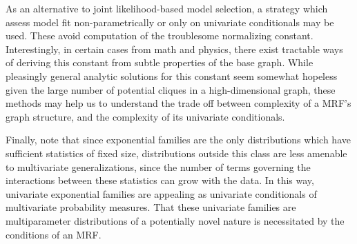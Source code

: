\documentclass{samkoelleprelimworking}
\begin{document}
As an alternative to joint likelihood-based model selection, a strategy which assess model fit non-parametrically or only on univariate conditionals may be used.  These avoid computation of the troublesome normalizing constant.  Interestingly, in certain cases from math and physics, there exist tractable ways of deriving this constant from subtle properties of the base graph.   While pleasingly general analytic solutions for this constant seem somewhat hopeless given the large number of potential cliques in a high-dimensional graph, these methods may help us to understand the trade off between complexity of a MRF's graph structure, and the complexity of its univariate conditionals.

Finally, note that since exponential families are the only distributions which have sufficient statistics of fixed size, distributions outside this class are less amenable to multivariate generalizations, since the number of terms governing the interactions between these statistics can grow with the data.  In this way, univariate exponential families are appealing as univariate conditionals of multivariate probability measures.  That these univariate families are multiparameter distributions of a potentially novel nature is necessitated by the conditions of an MRF.
 
  
   
\end{document}
